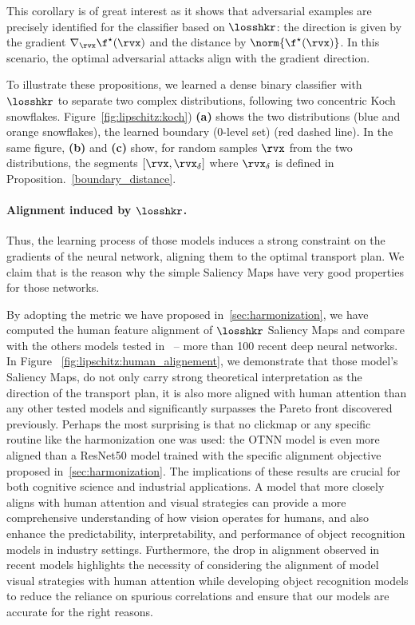 This corollary is of great interest as it shows that adversarial examples are precisely identified for the classifier based on $\losshkr$: the direction is given by the gradient $\nabla_{\rvx} \f^\star(\rvx)$ and the distance by $\norm{\f^\star(\rvx)}$. In this scenario, the optimal adversarial attacks align with the gradient direction.

To illustrate these propositions, we learned a dense binary classifier with $\losshkr$ to separate two complex distributions, following two concentric Koch snowflakes. Figure~\ref{fig:lipschitz:koch}) \textbf{(a)} shows the two distributions (blue and orange snowflakes), the learned boundary ($0$-level set) (red dashed line). In the same figure, \textbf{(b)} and \textbf{(c)} show, for random samples $\rvx$ from the two distributions, the segments $[\rvx,\rvx_\delta]$ where $\rvx_\delta$ is defined in Proposition.~\ref{boundary_distance}.

\paragraph{Alignment induced by $\losshkr$.}

Thus, the learning process of those models induces a strong constraint on the gradients of the neural network, aligning them to the optimal transport plan. We claim that is the reason why the simple Saliency Maps have very good properties for those networks.

By adopting the metric we have proposed in~\autoref{sec:harmonization}, we have computed the human feature alignment of $\losshkr$ Saliency Maps and compare with the others models tested in ~\cite{fel2022aligning}-- more than 100 recent deep neural networks. In Figure ~\ref{fig:lipschitz:human_alignement}, we demonstrate that those model's Saliency Maps, do not only carry strong theoretical interpretation as the direction of the transport plan, it is also more aligned with human attention than any other tested models and significantly surpasses the Pareto front discovered previously. Perhaps the most surprising is that no clickmap or any specific routine like the harmonization one was used: the OTNN model is even more aligned than a ResNet50 model trained with the specific alignment objective proposed in~\autoref{sec:harmonization}.
The implications of these results are crucial for both cognitive science and industrial applications. A model that more closely aligns with human attention and visual strategies can provide a more comprehensive understanding of how vision operates for humans, and also enhance the predictability, interpretability, and performance of object recognition models in industry settings. 
Furthermore, the drop in alignment observed in recent models highlights the necessity of considering the alignment of model visual strategies with human attention while developing object recognition models to reduce the reliance on spurious correlations and ensure that our models are accurate for the right reasons.


